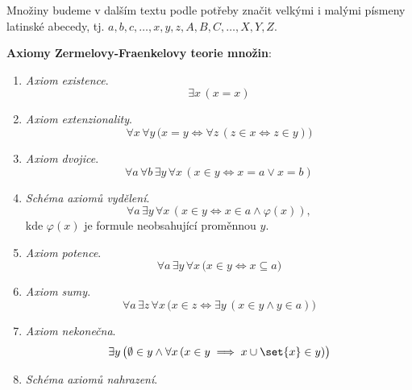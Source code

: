 \begin{convention}
    Množiny budeme v dalším textu podle potřeby značit velkými i malými písmeny latinské abecedy, tj. $a,b,c,\dots,x,y,z,A,B,C,\dots,X,Y,Z$.
\end{convention}
\noindent\textbf{Axiomy Zermelovy-Fraenkelovy teorie množin}:
\begin{enumerate}[label=({ZF}\arabic*)]
    \item\label{item:axiom_existence} \emph{Axiom existence}.
    \begin{equation*}
        \exists x\,(x=x)
    \end{equation*}
    \item\label{item:axiom_extenzionality} \emph{Axiom extenzionality}.
    \begin{equation*}
        \forall x\,\forall y\,\bigl(x=y \iff \forall z\,(z\in x \iff z\in y)\bigr)
    \end{equation*}
    \item\label{item:axiom_dvojice} \emph{Axiom dvojice}.
    \begin{equation*}
        \forall a\,\forall b\,\exists y\,\forall x\,(x \in y \iff x=a \lor x=b)
    \end{equation*}
    \item\label{item:schema_axiomu_vydeleni} \emph{Schéma axiomů vydělení}.
    \begin{equation*}
        \forall a\,\exists y\,\forall x\,(x\in y \iff x\in a \land \varphi(x)),
    \end{equation*}
    kde $\varphi(x)$ je formule neobsahující proměnnou $y$.
    \item\label{item:axiom_potence} \emph{Axiom potence}.
    \begin{equation*}
        \forall a\,\exists y\,\forall x\,\bigl(x\in y \iff x\subseteq a\bigr)
    \end{equation*}
    \item\label{item:axiom_sumy} \emph{Axiom sumy}.
    \begin{equation*}
        \forall a\,\exists z\,\forall x\,\bigl(x\in z\iff \exists y\,(x\in y \land y\in a)\bigr)
    \end{equation*}
    \item\label{item:axiom_nekonecna} \emph{Axiom nekonečna}.
    \begin{equation*}
        \exists y\,\bigl(\emptyset\in y \land \forall x\,(x\in y\implies x\cup\set{x}\in y)\bigr)
    \end{equation*}
    \item\label{item:schema_axiomu_nahrazeni} \emph{Schéma axiomů nahrazení}.

\end{enumerate}
